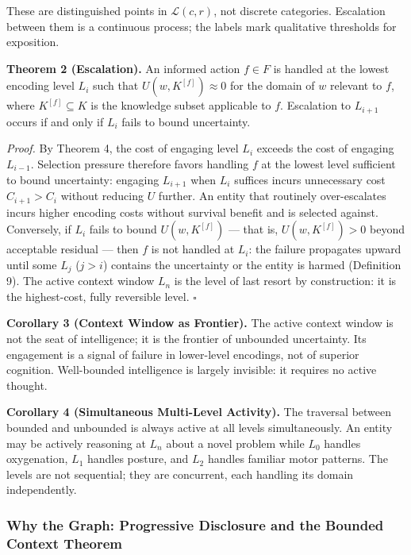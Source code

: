 \documentclass[
]{article}
\begin{document}
These are distinguished points in \(\mathcal{L}(c, r)\), not discrete
categories. Escalation between them is a continuous process; the labels
mark qualitative thresholds for exposition.

\textbf{Theorem 2 (Escalation).} An informed action \(f \in F\) is
handled at the lowest encoding level \(L_i\) such that
\(U(w, K^{[f]}) \approx 0\) for the domain of \(w\) relevant to \(f\),
where \(K^{[f]} \subseteq K\) is the knowledge subset applicable to
\(f\). Escalation to \(L_{i+1}\) occurs if and only if \(L_i\) fails to
bound uncertainty.

\emph{Proof.} By Theorem 4, the cost of engaging level \(L_i\) exceeds
the cost of engaging \(L_{i-1}\). Selection pressure therefore favors
handling \(f\) at the lowest level sufficient to bound uncertainty:
engaging \(L_{i+1}\) when \(L_i\) suffices incurs unnecessary cost
\(C_{i+1} > C_i\) without reducing \(U\) further. An entity that
routinely over-escalates incurs higher encoding costs without survival
benefit and is selected against. Conversely, if \(L_i\) fails to bound
\(U(w, K^{[f]})\) --- that is, \(U(w, K^{[f]}) > 0\) beyond acceptable
residual --- then \(f\) is not handled at \(L_i\): the failure
propagates upward until some \(L_j\) (\(j > i\)) contains the
uncertainty or the entity is harmed (Definition 9). The active context
window \(L_n\) is the level of last resort by construction: it is the
highest-cost, fully reversible level. \(\square\)

\textbf{Corollary 3 (Context Window as Frontier).} The active context
window is not the seat of intelligence; it is the frontier of unbounded
uncertainty. Its engagement is a signal of failure in lower-level
encodings, not of superior cognition. Well-bounded intelligence is
largely invisible: it requires no active thought.

\textbf{Corollary 4 (Simultaneous Multi-Level Activity).} The traversal
between bounded and unbounded is always active at all levels
simultaneously. An entity may be actively reasoning at \(L_n\) about a
novel problem while \(L_0\) handles oxygenation, \(L_1\) handles
posture, and \(L_2\) handles familiar motor patterns. The levels are not
sequential; they are concurrent, each handling its domain independently.

\subsubsection{Why the Graph: Progressive Disclosure and the Bounded
Context
Theorem}\label{why-the-graph-progressive-disclosure-and-the-bounded-context-theorem}
\end{document}
